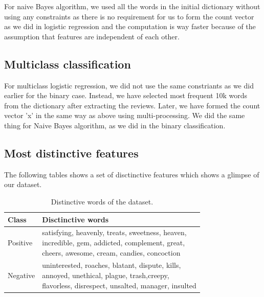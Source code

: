 \documentclass{article}
\begin{document}
For naive Bayes algorithm, we used all the words in the initial dictionary without using any constraints as there is no requirement for us to form the count vector as we did in logistic regression and the computation is way faster because of the assumption that features are independent of each other. 


\subsection{Multiclass classification}

For multiclass logistic regression, we did not use the same constriants as we did earlier for the binary case. Instead, we have selected most frequent 10k words from the dictionary after extracting the reviews. Later, we have formed the count vector 'x' in the same way as above using multi-processing. We did the same thing for Naive Bayes algorithm, as we did in the binary classification.

\subsection{Most distinctive features}
The following tables shows a set of disctinctive features which shows a glimpse of our dataset.
\begin{table}[H]
\caption{Distinctive words of the dataset.}
\vspace{1mm}
\label{sample-table}
\begin{small}
\begin{sc}
\begin{adjustbox}{width=0.5\textwidth}
\begin{tabular}{|l|l|}
\hline
Class &  Disctinctive words\\
\hline
Positive  &  \pbox{20cm}{\vspace{1mm}satisfying, heavenly, treats, sweetness, heaven, \\incredible, gem, addicted, complement, great,\\ cheers, awesome, cream, candies, concoction\vspace{1mm}}\\
\hline
Negative  &  \pbox{20cm}{\vspace{1mm}uninterested, roaches, blatant, dispute, kills,\\ annoyed, unethical, plague, trash,creepy,\\ flavorless, disrespect, unsalted, manager, insulted\vspace{1mm}}\\
\hline
\end{tabular}
\end{adjustbox}
\end{sc}
\end{small}
\end{table}
\end{document}
